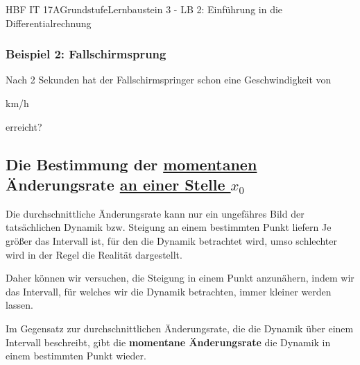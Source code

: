 \documentclass[11pt,twocolumn,oneside,openany,headings=optiontotoc,11pt,numbers=noenddot,final]{article}
\begin{document}
\begin{worksheet}{HBF IT 17A}{Grundstufe}{Lernbaustein 3 - LB 2: Einführung in die Differentialrechnung}
		\subsubsection*{Beispiel 2: Fallschirmsprung}
		Nach 2 Sekunden hat der Fallschirmspringer schon eine Geschwindigkeit von\\
		\begin{center}
			 km/h
		\end{center}
		erreicht?\\
		\par\noindent
		
		\subsection{Die Bestimmung der \underline{momentanen} Änderungsrate \underline{an einer Stelle \(x_{0}\)}}
		Die durchschnittliche Änderungsrate kann nur ein ungefähres Bild der tatsächlichen Dynamik bzw. Steigung an einem bestimmten Punkt liefern Je größer das Intervall ist, für den die Dynamik betrachtet wird, umso schlechter wird in der Regel die Realität dargestellt.\\
		\par\noindent
		Daher können wir versuchen, die Steigung in einem Punkt anzunähern, indem wir das Intervall, für welches wir die Dynamik betrachten, immer kleiner werden lassen.\\
		\par\noindent
		Im Gegensatz zur durchschnittlichen Änderungsrate, die die Dynamik über einem Intervall beschreibt, gibt die \textbf{momentane Änderungsrate} die Dynamik in einem bestimmten Punkt wieder.

\end{worksheet}
\end{document}
